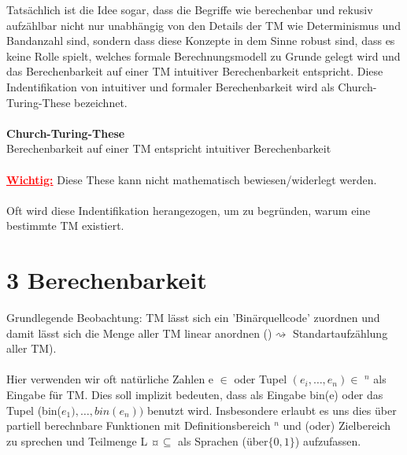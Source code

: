 \documentclass[a4paper]{article}
\begin{document}
Tatsächlich ist die Idee sogar, dass die Begriffe wie berechenbar und rekusiv aufzählbar nicht nur unabhängig von den Details der TM wie Determinismus und Bandanzahl sind, sondern dass diese Konzepte in dem Sinne robust sind, dass es keine Rolle spielt, welches formale Berechnungsmodell zu Grunde gelegt wird und das Berechenbarkeit auf einer TM intuitiver Berechenbarkeit entspricht. Diese Indentifikation von intuitiver und formaler Berechenbarkeit wird als Church-Turing-These bezeichnet. \\
\\
\textbf{\textcolor{KGN}{Church-Turing-These}} \\ \stepBoxCounter
Berechenbarkeit auf einer TM entspricht intuitiver Berechenbarkeit \\
\\
\textbf{\textcolor{red}{\underline{Wichtig:}}} Diese These kann nicht mathematisch bewiesen/widerlegt werden. \\
\\
Oft wird diese Indentifikation herangezogen, um zu begründen, warum eine bestimmte TM existiert.
\section{3 Berechenbarkeit}
\stepDefCounter
Grundlegende Beobachtung: TM lässt sich ein 'Binärquellcode' zuordnen und damit lässt sich die Menge aller TM linear anordnen ()$\rightsquigarrow$ Standartaufzählung aller TM). \\
\\
Hier verwenden wir oft natürliche Zahlen e $\in$ \NN oder Tupel $(e_i,\dots,e_n) \in$ \NN$^n$ als Eingabe für TM. Dies soll implizit bedeuten, dass als Eingabe bin(e) oder das Tupel (bin($e_1),\dots,bin(e_n))$ benutzt wird. Insbesondere erlaubt es uns dies über partiell berechnbare Funktionen mit Definitionsbereich \NN$^n$ und (oder) Zielbereich \NN zu sprechen und Teilmenge L ¤$\subseteq$ \NN als Sprachen (über$\lbrace 0,1 \rbrace$) aufzufassen.
\end{document}
